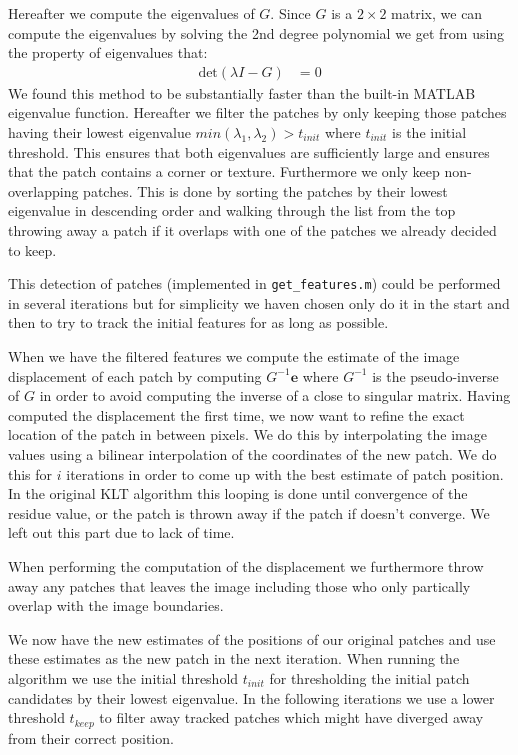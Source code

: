 \documentclass[11pt,a4paper]{article}
\begin{document}
Hereafter we compute the eigenvalues of $G$. Since $G$ is a $2 \times 2$ matrix,
we can compute the eigenvalues by solving the 2nd degree polynomial we
get from using the property of eigenvalues that:
\begin{align*}
    \text{det}\left( \lambda I - G\right) &= 0
\end{align*}
We found this method to be substantially faster than the built-in MATLAB eigenvalue function. Hereafter we filter the patches by only keeping those patches having their
lowest eigenvalue $min(\lambda_1,\lambda_2) > t_{init}$ where $t_{init}$ is the
initial threshold. This ensures that both eigenvalues are
sufficiently large and ensures that the patch contains a corner or texture.
Furthermore we only keep non-overlapping patches. This is done by sorting the patches by their
lowest eigenvalue in descending order and walking through the list from the top
throwing away a patch if it overlaps with one of the patches we already decided
to keep.

This detection of patches (implemented in \texttt{get\_features.m}) could be
performed in several iterations but for simplicity we haven chosen only do it in the start and then to
try to track the initial features for as long as possible.

When we have the filtered features we compute the estimate of the image
displacement of each patch by computing $G^{-1} \boldsymbol{e}$ where $G^{-1}$
is the pseudo-inverse of $G$ in order to avoid computing the inverse of a close
to singular matrix.
Having computed the displacement the first time, we now want to refine the exact
location of the patch in between pixels. We do this by interpolating the image
values using a bilinear interpolation of the coordinates of the new patch. We
do this for $i$ iterations in order to come up with the best estimate of patch
position. In the original KLT algorithm this looping is done until convergence of the residue value, or the patch is thrown away if the patch if doesn't converge. We left out this part due to lack of time.

When performing the computation of the displacement we furthermore throw away
any patches that leaves the image including those who only partically overlap
with the image boundaries.

We now have the new estimates of the positions of our original patches and use
these estimates as the new patch in the next iteration. When running the
algorithm we use the initial threshold $t_{init}$ for thresholding the initial
patch candidates by their lowest eigenvalue. In the following iterations we use
a lower threshold $t_{keep}$ to filter away tracked patches which might have
diverged away from their correct position.
%
\end{document}
